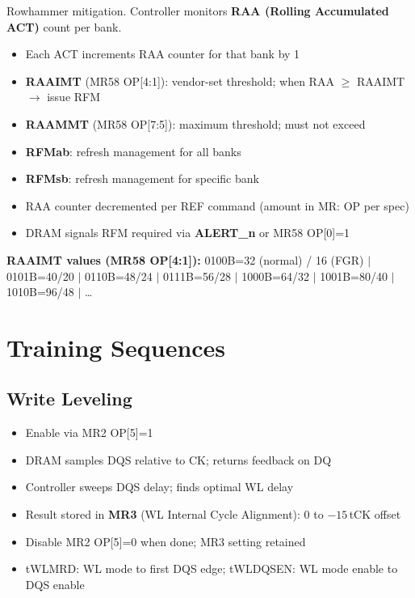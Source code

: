 \documentclass[10pt,a4paper,twoside]{article}
\begin{document}
Rowhammer mitigation. Controller monitors \textbf{RAA (Rolling Accumulated ACT)} count per bank.
\begin{itemize}
  \item Each ACT increments RAA counter for that bank by 1
  \item \textbf{RAAIMT} (MR58 OP[4:1]): vendor-set threshold; when RAA $\geq$ RAAIMT $\rightarrow$ issue RFM
  \item \textbf{RAAMMT} (MR58 OP[7:5]): maximum threshold; must not exceed
  \item \textbf{RFMab}: refresh management for all banks
  \item \textbf{RFMsb}: refresh management for specific bank
  \item RAA counter decremented per REF command (amount in MR: OP per spec)
  \item DRAM signals RFM required via \textbf{ALERT\_n} or MR58 OP[0]=1
\end{itemize}

\textbf{RAAIMT values (MR58 OP[4:1]):}
0100B=32 (normal) / 16 (FGR) $|$ 0101B=40/20 $|$ 0110B=48/24 $|$ 0111B=56/28 $|$
1000B=64/32 $|$ 1001B=80/40 $|$ 1010B=96/48 $|$ \ldots

\section{Training Sequences}

\subsection{Write Leveling}

\begin{itemize}
  \item Enable via MR2 OP[5]=1
  \item DRAM samples DQS relative to CK; returns feedback on DQ
  \item Controller sweeps DQS delay; finds optimal WL delay
  \item Result stored in \textbf{MR3} (WL Internal Cycle Alignment): 0 to $-15$\,tCK offset
  \item Disable MR2 OP[5]=0 when done; MR3 setting retained
  \item tWLMRD: WL mode to first DQS edge; tWLDQSEN: WL mode enable to DQS enable
\end{itemize}
\end{document}
